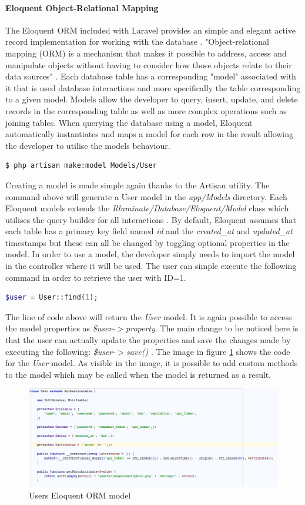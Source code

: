 \paragraph{Eloquent Object-Relational Mapping}
The Eloquent ORM included with Laravel provides an simple and elegant active record implementation for working with the database \cite{Laravel:Eloquent}. "Object-relational mapping (ORM) is a mechanism that makes it possible to address, access and manipulate objects without having to consider how those objects relate to their data sources" \cite{TechTarget:ORM}. Each database table has a corresponding "model" associated with it that is used database interactions and more specifically the table corresponding to a given model. Models allow the developer to query, insert, update, and delete records in the corresponding table as well as more complex operations such as joining tables. When querying the database using a model, Eloquent automatically instantiates and maps a model for each row in the result allowing the developer to utilise the models behaviour.

\begin{lstlisting}[language=bash]
	$ php artisan make:model Models/User
\end{lstlisting}

\noindent Creating a model is made simple again thanks to the Artisan utility. The command above will generate a User model in the \emph{app/Models} directory. Each Eloquent models extends the \emph{Illuminate/Database/Eloquent/Model} class which utilises the query builder for all interactions \cite{Laravel:Eloquent}. By default, Eloquent assumes that each table has a primary key field named \emph{id} and the \emph{created\_at} and \emph{updated\_at} timestamps but these can all be changed by toggling optional properties in the model. In order to use a model, the developer simply needs to import the model in the controller where it will be used. The user can simple execute the following command in order to retrieve the user with ID=1.

\begin{lstlisting}[language=php]
	$user = User::find(1);
\end{lstlisting}

\noindent The line of code above will return the \emph{User} model. It is again possible to access the model properties as \emph{\$user-$>$property}. The main change to be noticed here is that the user can actually update the properties and save the changes made by executing the following: \emph{\$user-$>$save()} \cite{Laravel:Eloquent}.  The image in figure \ref{fig:UserModel} shows the code for the \emph{User} model. As visible in the image, it is possible to add custom methods to the model which may be called when the model is returned as a result.

\begin{figure}[H]
	\centering
	\includegraphics[width=1.0\textwidth]{Images/Implementation/UserModel}
	\caption{Users Eloquent ORM model} \label{fig:UserModel}
\end{figure}